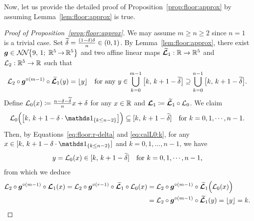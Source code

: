 \documentclass[nohyperref]{article}
\theoremstyle{plain}
\theoremstyle{definition}
\theoremstyle{remark}
\begin{document}
Now, let us provide the detailed proof of Proposition~\ref{prop:floor:approx} by assuming Lemma~\ref{lem:floor:approx} is true. 
\begin{proof}[Proof of Proposition~\ref{prop:floor:approx}]
	We may assume $m\ge  n\ge 2$ since $n=1$ is a trivial case.
Set ${\widetilde{\delta}}=\tfrac{(1-\delta)\delta}{n}\in (0,1)$. By Lemma~\ref{lem:floor:approx}, 
there exist $\bmg \in
\nn[\big]{9}{1}{5}{5}$
and two affine linear maps $\bmtildecalL_1:\R\to\R^5$ and $\calL_2:\R^5\to \R$ such that
\begin{equation}%
	\label{eq:floor:r-delta}
	\calL_2\circ\bmg^{\circ (m-1)}\circ \bmtildecalL_1(y)=\lfloor y\rfloor \quad \tn{for any $y\in \bigcup_{k=0}^{m-1}\big[k,\,k+1-\tildedelta\big]\supseteq \bigcup_{k=0}^{n-1}\big[k,\,k+1-\tildedelta\big]$}.
\end{equation}
	Define ${\mathcal{L}}_0(x)\coloneqq \tfrac{n-\delta-{\widetilde{\delta}}}{n}x+\delta$  for any $x\in\R$ and ${\bm{\mathcal{L}}}_1\coloneqq {\bm{\mathcal{\widetilde{L}}}}_1\circ {\mathcal{L}}_0$.
%	
%	
We claim 
\begin{equation}\label{eq:calL0:k}
	\calL_0\Big(\big[k,\,k+1-\delta\cdot\one_{\{k\le n-2\}}\big]\Big)\subseteq [k,\, k+1-\tildedelta]\quad \tn{for $k=0,1,\dotsc,n-1$.}
\end{equation}
Then,
 by Equations~\eqref{eq:floor:r-delta} and \eqref{eq:calL0:k}, 
 for any $x\in [k,\,k+1-\delta\cdot\one_{\{k\le n-2\}}]$ and $k=0,1,\dotsc,n-1$, 
we have 
\begin{equation*}
    y=\calL_0(x)\in [k,\, k+1-\tildedelta]\quad \tn{for $k=0,1,\dotsc,n-1$,}
\end{equation*}
from which we deduce
\begin{equation*}
	\begin{split}
		{\mathcal{L}}_2\circ{\bm{g}}^{\circ (m-1)}\circ {\bm{\mathcal{L}}}_1(x)
		={\mathcal{L}}_2\circ{\bm{g}}^{\circ (r-1)}\circ {\bm{\mathcal{\widetilde{L}}}}_1\circ {\mathcal{L}}_0(x)
		&={\mathcal{L}}_2\circ{\bm{g}}^{\circ (m-1)}\circ {\bm{\mathcal{\widetilde{L}}}}_1\Big({\mathcal{L}}_0(x)\Big)\\
  &={\mathcal{L}}_2\circ{\bm{g}}^{\circ (m-1)}\circ {\bm{\mathcal{\widetilde{L}}}}_1(y)
		=\lfloor y\rfloor =k. 		
	\end{split}
\end{equation*}



\end{proof}
\end{document}
